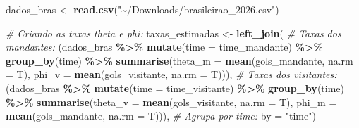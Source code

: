 \documentclass[11pt,]{article}
\newenvironment{Shaded}{\begin{snugshade}}{\end{snugshade}}
\newcommand{\AttributeTok}[1]{\textcolor[rgb]{0.13,0.29,0.53}{#1}}
\newcommand{\CommentTok}[1]{\textcolor[rgb]{0.56,0.35,0.01}{\textit{#1}}}
\newcommand{\FunctionTok}[1]{\textcolor[rgb]{0.13,0.29,0.53}{\textbf{#1}}}
\newcommand{\NormalTok}[1]{#1}
\newcommand{\OtherTok}[1]{\textcolor[rgb]{0.56,0.35,0.01}{#1}}
\newcommand{\SpecialCharTok}[1]{\textcolor[rgb]{0.81,0.36,0.00}{\textbf{#1}}}
\newcommand{\StringTok}[1]{\textcolor[rgb]{0.31,0.60,0.02}{#1}}
\begin{document}
\begin{Shaded}
\begin{Highlighting}[]
\NormalTok{dados\_bras }\OtherTok{\textless{}{-}} \FunctionTok{read.csv}\NormalTok{(}\StringTok{"\textasciitilde{}/Downloads/brasileirao\_2026.csv"}\NormalTok{)}

\CommentTok{\# Criando as taxas theta e phi:}
\NormalTok{taxas\_estimadas }\OtherTok{\textless{}{-}} \FunctionTok{left\_join}\NormalTok{(}
    \CommentTok{\# Taxas dos mandantes:}
\NormalTok{    (dados\_bras }\SpecialCharTok{\%\textgreater{}\%}
    \FunctionTok{mutate}\NormalTok{(}\AttributeTok{time =}\NormalTok{ time\_mandante) }\SpecialCharTok{\%\textgreater{}\%}
    \FunctionTok{group\_by}\NormalTok{(time) }\SpecialCharTok{\%\textgreater{}\%}
    \FunctionTok{summarise}\NormalTok{(}\AttributeTok{theta\_m =} \FunctionTok{mean}\NormalTok{(gols\_mandante, }\AttributeTok{na.rm =}\NormalTok{ T),}
              \AttributeTok{phi\_v =} \FunctionTok{mean}\NormalTok{(gols\_visitante, }\AttributeTok{na.rm =}\NormalTok{ T))),}
    \CommentTok{\# Taxas dos visitantes:}
\NormalTok{    (dados\_bras }\SpecialCharTok{\%\textgreater{}\%}
    \FunctionTok{mutate}\NormalTok{(}\AttributeTok{time =}\NormalTok{ time\_visitante) }\SpecialCharTok{\%\textgreater{}\%}
    \FunctionTok{group\_by}\NormalTok{(time) }\SpecialCharTok{\%\textgreater{}\%}
    \FunctionTok{summarise}\NormalTok{(}\AttributeTok{theta\_v =} \FunctionTok{mean}\NormalTok{(gols\_visitante, }\AttributeTok{na.rm =}\NormalTok{ T),}
              \AttributeTok{phi\_m =} \FunctionTok{mean}\NormalTok{(gols\_mandante, }\AttributeTok{na.rm =}\NormalTok{ T))),}
    \CommentTok{\# Agrupa por time:}
    \AttributeTok{by =} \StringTok{"time"}\NormalTok{)}
\end{Highlighting}
\end{Shaded}
\end{document}
